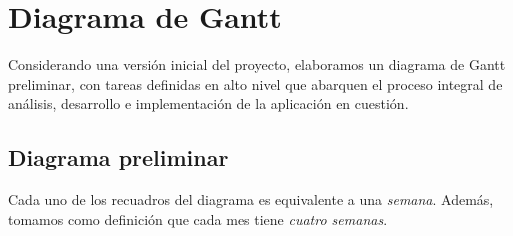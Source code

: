 \documentclass[a4paper,12pt]{article}
\begin{document}
    \newpage

    \section{Diagrama de Gantt}
    Considerando una versión inicial del proyecto, elaboramos un diagrama de Gantt preliminar, con tareas definidas en alto nivel que abarquen el proceso integral de análisis, desarrollo e implementación de la aplicación en cuestión.
    \subsection{Diagrama preliminar}
    Cada uno de los recuadros del diagrama es equivalente a una \textit{semana}. Además, tomamos como definición que cada mes tiene \textit{cuatro semanas}.
    
\end{document}

